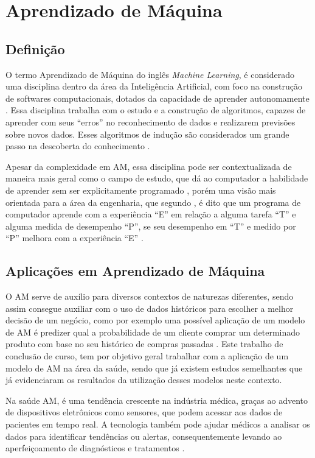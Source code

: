 \chapter{Aprendizado de Máquina}
\section{Definição}
O termo Aprendizado de Máquina do inglês \textit{Machine Learning}, é considerado uma disciplina dentro da área da Inteligência Artificial, com foco na construção de softwares computacionais, dotados da capacidade de aprender autonomamente \cite{Hosch}. Essa disciplina trabalha com o estudo e a construção de algoritmos, capazes de aprender com seus “erros” no reconhecimento de dados e realizarem previsões sobre novos dados. Esses algoritmos de indução são considerados um grande passo na descoberta do conhecimento \cite{Kohavi}.

Apesar da complexidade em AM, essa disciplina pode ser contextualizada de maneira mais geral como o campo de estudo, que dá ao computador a habilidade de aprender sem ser explicitamente programado \cite{Arthur}, porém uma visão mais orientada para a área da engenharia, que segundo , é dito que um programa de computador aprende com a experiência “E” em relação a alguma tarefa “T” e alguma medida de desempenho “P”, se seu desempenho em “T” e medido por “P” melhora com a experiência “E” \cite{Tom}.

\section{Aplicações em Aprendizado de Máquina}
O AM serve de auxílio para diversos contextos de naturezas diferentes, sendo assim consegue auxiliar com o uso de dados históricos para escolher a melhor decisão de um negócio, como por exemplo uma possível aplicação de um modelo de AM é predizer qual a probabilidade de um cliente comprar um determinado produto com base no seu histórico de compras passadas \cite{Amazon}. Este trabalho de conclusão de curso, tem por objetivo geral trabalhar com a aplicação de um modelo de AM na área da saúde, sendo que já existem estudos semelhantes que já evidenciaram os resultados da utilização desses modelos neste contexto.

Na saúde AM, é uma tendência crescente na indústria médica, graças ao advento de dispositivos eletrônicos como sensores, que podem acessar aos dados de pacientes em tempo real. A tecnologia também pode ajudar médicos a analisar os dados para identificar tendências ou alertas, consequentemente levando ao aperfeiçoamento de diagnósticos e tratamentos \cite{Sas}.

